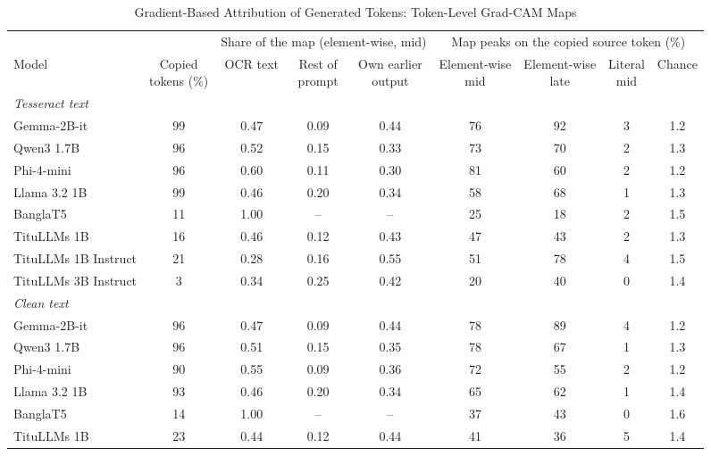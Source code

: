 \begin{table}[t]
\centering
\caption{Gradient-Based Attribution of Generated Tokens: Token-Level Grad-CAM Maps}
\label{tab:attribution}
\setlength{\tabcolsep}{4pt}
\footnotesize
\begin{tabular}{lcccccccc}
\toprule
 & & \multicolumn{3}{c}{Share of the map (element-wise, mid)} & \multicolumn{4}{c}{Map peaks on the copied source token (\%)} \\
\cmidrule(lr){3-5}\cmidrule(lr){6-9}
Model & \shortstack{Copied\\tokens (\%)} & OCR text & \shortstack{Rest of\\prompt} & \shortstack{Own earlier\\output} & \shortstack{Element-wise\\mid} & \shortstack{Element-wise\\late} & \shortstack{Literal\\mid} & Chance \\
\midrule
\multicolumn{9}{l}{\textit{Tesseract text}} \\
Gemma-2B-it & 99 & 0.47 & 0.09 & 0.44 & 76 & 92 & 3 & 1.2 \\
Qwen3 1.7B & 96 & 0.52 & 0.15 & 0.33 & 73 & 70 & 2 & 1.3 \\
Phi-4-mini & 96 & 0.60 & 0.11 & 0.30 & 81 & 60 & 2 & 1.2 \\
Llama 3.2 1B & 99 & 0.46 & 0.20 & 0.34 & 58 & 68 & 1 & 1.3 \\
BanglaT5 & 11 & 1.00 & -- & -- & 25 & 18 & 2 & 1.5 \\
TituLLMs 1B & 16 & 0.46 & 0.12 & 0.43 & 47 & 43 & 2 & 1.3 \\
TituLLMs 1B Instruct & 21 & 0.28 & 0.16 & 0.55 & 51 & 78 & 4 & 1.5 \\
TituLLMs 3B Instruct & 3 & 0.34 & 0.25 & 0.42 & 20 & 40 & 0 & 1.4 \\
\midrule
\multicolumn{9}{l}{\textit{Clean text}} \\
Gemma-2B-it & 96 & 0.47 & 0.09 & 0.44 & 78 & 89 & 4 & 1.2 \\
Qwen3 1.7B & 96 & 0.51 & 0.15 & 0.35 & 78 & 67 & 1 & 1.3 \\
Phi-4-mini & 90 & 0.55 & 0.09 & 0.36 & 72 & 55 & 2 & 1.2 \\
Llama 3.2 1B & 93 & 0.46 & 0.20 & 0.34 & 65 & 62 & 1 & 1.4 \\
BanglaT5 & 14 & 1.00 & -- & -- & 37 & 43 & 0 & 1.6 \\
TituLLMs 1B & 23 & 0.44 & 0.12 & 0.44 & 41 & 36 & 5 & 1.4 \\

\end{tabular}
\end{table}
